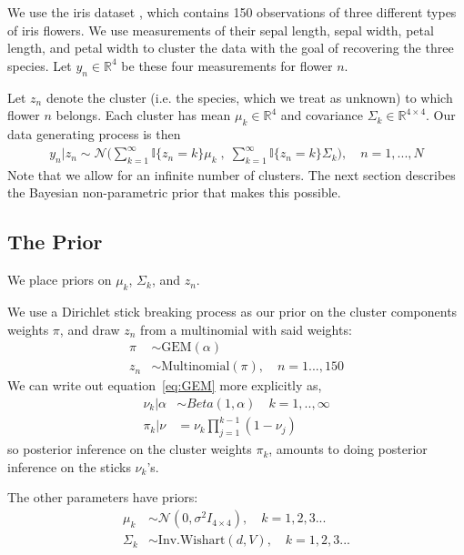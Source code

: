 We use the iris dataset \citep{iris_data_anderson,
iris_data_fisher}, which contains 150 observations of three different types of
iris flowers. We use measurements of their sepal length, sepal width, petal
length, and petal width to cluster the data with the goal of recovering the
three species. Let $y_{n}\in \mathbb{R}^4$ be these four measurements for flower
$n$.

Let $z_n$ denote the cluster (i.e. the species, which we treat as unknown) to
which flower $n$ belongs. Each cluster has mean $\mu_k\in \mathbb{R}^4$ and
covariance $\Sigma_k \in \mathbb{R}^{4\times 4}$. Our data generating process is
then
%
\begin{align}
	y_n | z_n \sim \mathcal{N}\Big(\sum_{k=1}^\infty \mathbb{I}\{z_n = k\} \mu_k \;,
              \; \sum_{k=1}^\infty \mathbb{I}\{z_n = k\} \Sigma_k\Big),
	\quad n = 1, ..., N
\end{align}
%
Note that we allow for an infinite number of clusters. The next section
describes the Bayesian non-parametric prior that makes this possible.

\subsection{The Prior}
We place priors on $\mu_k$, $\Sigma_k$, and $z_n$.

We use a Dirichlet stick breaking process \citep{ferguson:1973:bayesian,
sethuraman:1994:constructivedp} as our prior on the cluster components weights
$\pi$, and draw $z_n$ from a multinomial with said weights:
%
\begin{align}
	\pi &\sim \text{GEM}(\alpha) \label{eq:GEM} \\
	 z_n &\sim \text{Multinomial}(\pi), \quad n = 1..., 150
\end{align}
%
We can write out equation~\ref{eq:GEM} more explicitly as,
%
\begin{align}
  \nu_k | \alpha &\sim Beta(1, \alpha) \quad k = 1, .., \infty \label{eq:beta_sticks}\\
  \pi_k | \nu &= \nu_k \prod_{j=1}^{k-1} (1 - \nu_j) \label{eq:stick_breaking}
\end{align}
%
so posterior inference on the cluster weights $\pi_k$, amounts to doing
posterior inference on the sticks $\nu_k$'s.

The other parameters have priors:
\begin{align}
	\mu_k &\sim \mathcal{N}(0, \sigma^2 I_{4\times 4}), \quad k = 1, 2, 3 ... \\
	\Sigma_k &\sim \text{Inv.Wishart}(d, V), \quad k = 1, 2, 3 ...
\end{align}
